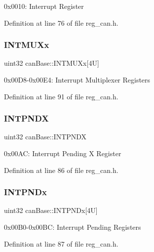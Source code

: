 0x0010\+: Interrupt Register 

Definition at line 76 of file reg\+\_\+can.\+h.

\mbox{\label{structcanBase_a27ac0a91c51b8f665ce7843d5ce0acca}} 
\subsubsection{\texorpdfstring{I\+N\+T\+M\+U\+Xx}{INTMUXx}}
{\footnotesize\ttfamily uint32 can\+Base\+::\+I\+N\+T\+M\+U\+Xx\mbox{[}4\+U\mbox{]}}

0x00\+D8-\/0x00\+E4\+: Interrupt Multiplexer Registers 

Definition at line 91 of file reg\+\_\+can.\+h.

\mbox{\label{structcanBase_aa4d4cce2d55570cfa05e9697dc330fd5}} 
\subsubsection{\texorpdfstring{I\+N\+T\+P\+N\+DX}{INTPNDX}}
{\footnotesize\ttfamily uint32 can\+Base\+::\+I\+N\+T\+P\+N\+DX}

0x00\+AC\+: Interrupt Pending X Register 

Definition at line 86 of file reg\+\_\+can.\+h.

\mbox{\label{structcanBase_a880fd16ed2898d4b660878c57e136c50}} 
\subsubsection{\texorpdfstring{I\+N\+T\+P\+N\+Dx}{INTPNDx}}
{\footnotesize\ttfamily uint32 can\+Base\+::\+I\+N\+T\+P\+N\+Dx\mbox{[}4\+U\mbox{]}}

0x00\+B0-\/0x00\+BC\+: Interrupt Pending Registers 

Definition at line 87 of file reg\+\_\+can.\+h.

\mbox{\label{structcanBase_a57ef58c7d27fe64b66d6a315ccc18712}} 
